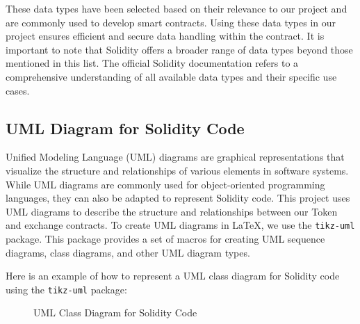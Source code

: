 These data types have been selected based on their relevance to our project and are commonly used to develop smart contracts. Using these data types in our project ensures efficient and secure data handling within the contract.
It is important to note that Solidity offers a broader range of data types beyond those mentioned in this list. The official Solidity documentation \cite{ethereum_solidity_doc} refers to a comprehensive understanding of all 
available data types and their specific use cases.


\subsection{UML Diagram for Solidity Code}

Unified Modeling Language (UML) diagrams are graphical representations that visualize the structure and relationships of various elements
in software systems. While UML diagrams are commonly used for object-oriented programming languages, they can also be adapted to represent
Solidity code. This project uses UML diagrams to describe the structure and relationships between our Token and exchange contracts.
To create UML diagrams in \LaTeX, we use the \texttt{tikz-uml} package. This package provides a set of macros for creating UML sequence diagrams, class diagrams, 
and other UML diagram types.


Here is an example of how to represent a UML class diagram for Solidity code using the \texttt{tikz-uml} package:


\begin{figure}[H]
   \centering
   \caption{UML Class Diagram for Solidity Code}
   \label{fig:uml_diagram}
\end{figure}

